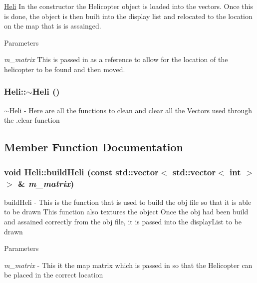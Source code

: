 \hyperlink{classHeli}{Heli} In the constructor the Helicopter object is loaded into the vectors. Once this is done, the object is then built into the display list and relocated to the location on the map that is is assainged. 
\begin{DoxyParams}{Parameters}
\item[{\em m\_\-matrix}]This is passed in as a reference to allow for the location of the helicopter to be found and then moved. \end{DoxyParams}
\hypertarget{classHeli_a935c117e63b10879606e1cb6bf58da83}{
\subsubsection[{$\sim$Heli}]{\setlength{\rightskip}{0pt plus 5cm}Heli::$\sim$Heli ()}}
\label{classHeli_a935c117e63b10879606e1cb6bf58da83}


$\sim$Heli -\/ Here are all the functions to clean and clear all the Vectors used through the .clear function 

\subsection{Member Function Documentation}
\hypertarget{classHeli_a2b4ba9ea5d9f95a75f04cf4ce111f581}{
\subsubsection[{buildHeli}]{\setlength{\rightskip}{0pt plus 5cm}void Heli::buildHeli (const std::vector$<$ std::vector$<$ int $>$ $>$ \& {\em m\_\-matrix})}}
\label{classHeli_a2b4ba9ea5d9f95a75f04cf4ce111f581}


buildHeli -\/ This is the function that is used to build the obj file so that it is able to be drawn This function also textures the object Once the obj had been build and assained correctly from the obj file, it is passed into the displayList to be drawn 
\begin{DoxyParams}{Parameters}
\item[{\em m\_\-matrix}]-\/ This it the map matrix which is passed in so that the Helicopter can be placed in the correct location \end{DoxyParams}


